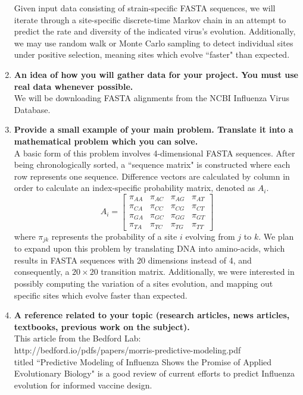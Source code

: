 \documentclass[12pt]{article}
\begin{document}
\begin{enumerate}
    Given input data consisting of strain-specific FASTA sequences, we will iterate through a site-specific discrete-time Markov chain in an attempt to predict the rate and diversity of the indicated virus's evolution. Additionally, we may use random walk or Monte Carlo sampling to detect individual sites under positive selection, meaning sites which evolve ``faster" than expected.
    \item \textbf{An idea of how you will gather data for your project. You must use real data whenever possible.}\\
    We will be downloading FASTA alignments from the NCBI Influenza Virus Database.
    \item \textbf{Provide a small example of your main problem. Translate it into a mathematical problem which you can solve.}\\
    A basic form of this problem involves 4-dimensional FASTA sequences. After being chronologically sorted, a ``sequence matrix" is constructed where each row represents one sequence. Difference vectors are calculated by column in order to calculate an index-specific probability matrix, denoted as $A_i$.
    \[
    A_i =
        \begin{bmatrix}
            \pi_{AA} & \pi_{AC} & \pi_{AG} & \pi_{AT} \\
            \pi_{CA} & \pi_{CC} & \pi_{CG} & \pi_{CT} \\
            \pi_{GA} & \pi_{GC} & \pi_{GG} & \pi_{GT} \\
            \pi_{TA} & \pi_{TC} & \pi_{TG} & \pi_{TT}
        \end{bmatrix}
    \]
    where $\pi_{jk}$ represents the probability of a site $i$ evolving from $j$ to $k$. We plan to expand upon this problem by translating DNA into amino-acids, which results in FASTA sequences with 20 dimensions instead of 4, and consequently, a $20 \times 20$ transition matrix. Additionally, we were interested in possibly computing the variation of a sites evolution, and mapping out specific sites which evolve faster than expected.
    \item \textbf{A reference related to your topic (research articles, news articles, textbooks, previous work on the subject).}\\ This article from the Bedford Lab:
    \\ http://bedford.io/pdfs/papers/morris-predictive-modeling.pdf \\ titled ``Predictive Modeling of Influenza Shows the Promise of Applied Evolutionary Biology" is a good review of current efforts to predict Influenza evolution for informed vaccine design.

\end{enumerate}
\end{document}
